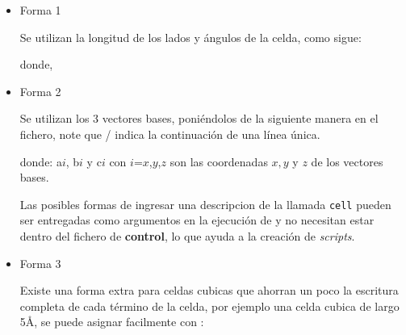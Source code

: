 \begin{itemize} 
\item{Forma 1}

Se utilizan la longitud de los lados y \'angulos de la celda, como sigue:


donde,


\item{Forma 2}

Se utilizan los 3 vectores bases, poni\'endolos de la siguiente manera en el fichero, note que / indica la continuaci\'on de una l\'inea \'unica.


donde: a${i}$, b${i}$ y c${i}$ con $i$={$x$,$y$,$z$} son las coordenadas $x, y$ y $z$ de los vectores bases.

Las posibles formas de ingresar una descripcion de la llamada \verb|cell| pueden ser entregadas como argumentos en la ejecuci\'on de {\lpmd} y no necesitan estar dentro del fichero de \textbf{control}, lo que ayuda a la creaci\'on de \textit{scripts}.



\item{Forma 3}

Existe una forma extra para celdas cubicas que ahorran un poco la escritura completa de cada t\'ermino de la celda, por ejemplo una celda cubica de largo 5\AA, se puede asignar facilmente con :


\end{itemize}

